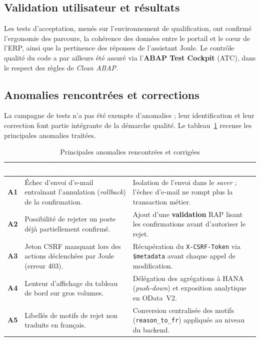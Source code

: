 \documentclass[12pt,a4paper,oneside]{report}
\begin{document}
\subsection{Validation utilisateur et résultats}\label{ch5:tests-uat}
Les tests d'acceptation, menés sur l'environnement de qualification, ont confirmé
l'ergonomie des parcours, la cohérence des données entre le portail et le c\oe ur de l'ERP,
ainsi que la pertinence des réponses de l'assistant Joule. Le contrôle qualité du code a
par ailleurs été assuré via l'\textbf{ABAP Test Cockpit} (ATC), dans le respect des règles
de \textit{Clean ABAP}.

\subsection{Anomalies rencontrées et corrections}\label{ch5:tests-anomalies}
La campagne de tests n'a pas été exempte d'anomalies ; leur identification et leur
correction font partie intégrante de la démarche qualité. Le tableau~\ref{tab:anomalies}
recense les principales anomalies traitées.

\begin{table}[H]
\centering
\footnotesize
\renewcommand{\arraystretch}{1.4}
\setlength{\tabcolsep}{6pt}
\renewcommand{\tabularxcolumn}[1]{m{#1}}
\begin{tabularx}{\textwidth}{>{\bfseries\color{MidnightBlue}}m{0.8cm} >{\raggedright\arraybackslash}X >{\raggedright\arraybackslash}X}
\toprule
\rowcolor{RoyalBlue!65}
\textcolor{white}{\textbf{\#}} & \textcolor{white}{\textbf{Anomalie constatée}} & \textcolor{white}{\textbf{Correction apportée}} \\
\midrule
A1 & Échec d'envoi d'e-mail entraînant l'annulation (\textit{rollback}) de la confirmation. & Isolation de l'envoi dans le \textit{saver} ; l'échec d'e-mail ne rompt plus la transaction métier. \\
A2 & Possibilité de rejeter un poste déjà partiellement confirmé. & Ajout d'une \textbf{validation} RAP lisant les confirmations avant d'autoriser le rejet. \\
A3 & Jeton CSRF manquant lors des actions déclenchées par Joule (erreur 403). & Récupération du \texttt{X-CSRF-Token} via \texttt{\$metadata} avant chaque appel de modification. \\
A4 & Lenteur d'affichage du tableau de bord sur gros volumes. & Délégation des agrégations à HANA (\textit{push-down}) et exposition analytique en OData~V2. \\
A5 & Libellés de motifs de rejet non traduits en français. & Conversion centralisée des motifs (\texttt{reason\_to\_fr}) appliquée au niveau du backend. \\
\bottomrule
\end{tabularx}
\caption{Principales anomalies rencontrées et corrigées}
\label{tab:anomalies}
\end{table}
\end{document}
